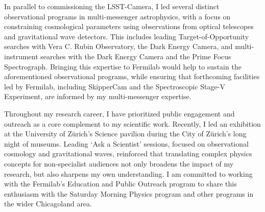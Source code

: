 \documentclass[10.5pt]{article}
\begin{document}

In parallel to commissioning the LSST-Camera, I led several distinct observational programs in multi-messenger astrophysics, with a focus on constraining cosmological parameters using observations from optical telescopes and gravitational wave detectors. This includes leading Target-of-Opportunity searches with Vera C. Rubin Observatory, the Dark Energy Camera, and multi-instrument searches with the Dark Energy Camera and the Prime Focus Spectrograph. 
\textcolor{\tcolor}{Bringing this expertise to Fermilab would help to sustain the aforementioned observational programs, while ensuring that forthcoming facilities led by Fermilab, including SkipperCam and the Spectroscopic Stage-V Experiment, are informed by my multi-messenger expertise.} 


Throughout my research career, I have prioritized public engagement and outreach as a core complement to my scientific work. 
Recently, I led an exhibition at the University of Zürich's Science pavilion during the City of Zürich's long night of museums. Leading `Ask a Scientist' sessions, focused on observational cosmology and gravitational waves, reinforced that translating complex physics concepts for non-specialist audiences not only broadens the impact of my research, but also sharpens my own understanding.
\textcolor{\tcolor}{I am committed to working with the Fermilab’s Education and Public Outreach program to share this enthusiasm with the Saturday Morning Physics program and other programs in the wider Chicagoland area.}
\end{document}
